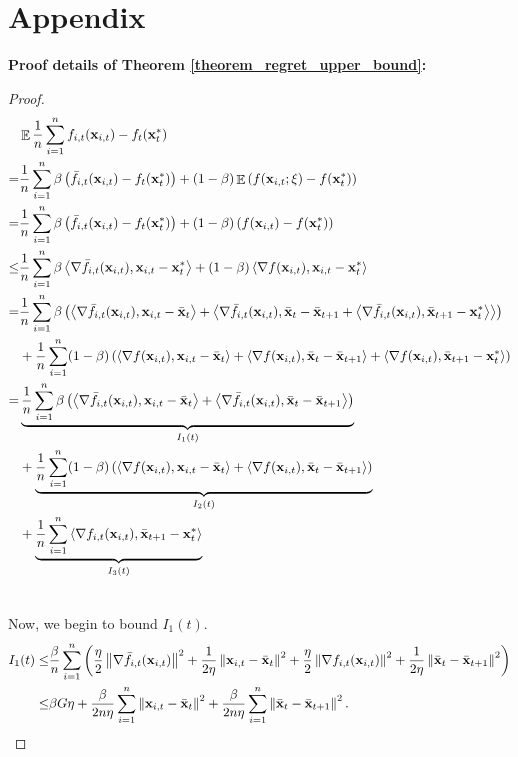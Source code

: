 \documentclass{article}
\begin{document}
\section*{Appendix}

\textbf{Proof details of Theorem \ref{theorem_regret_upper_bound}:}
\begin{proof}
\begin{align}
\nonumber
& \mathop{\mathbb{E}} \frac{1}{n}\sum_{i=1}^n f_{i,t}({\bf x}_{i,t}) - f_t({\bf x}_t^\ast) \\ \nonumber
=& \frac{1}{n}\sum_{i=1}^n \beta \left( \bar{f}_{i,t}({\bf x}_{i,t}) - f_t({\bf x}_t^\ast) \right) + (1-\beta) \mathop{\mathbb{E}} \left( f({\bf x}_{i,t};\xi) - f({\bf x}_t^\ast) \right) \\ \nonumber
=& \frac{1}{n}\sum_{i=1}^n \beta \left( \bar{f}_{i,t}({\bf x}_{i,t}) - f_t({\bf x}_t^\ast) \right) + (1-\beta) \left( f({\bf x}_{i,t}) - f({\bf x}_t^\ast) \right) \\ \nonumber 
\le & \frac{1}{n}\sum_{i=1}^n \beta \left\langle\nabla \bar{f}_{i,t}({\bf x}_{i,t}), {\bf x}_{i,t} - {\bf x}_t^\ast  \right\rangle + (1-\beta) \left\langle\nabla f({\bf x}_{i,t}), {\bf x}_{i,t} - {\bf x}_t^\ast  \right\rangle \\ \nonumber
 = & \frac{1}{n}\sum_{i=1}^n \beta \left( \left\langle\nabla \bar{f}_{i,t}({\bf x}_{i,t}), {\bf x}_{i,t} - \bar{{\bf x}}_t  \right\rangle + \left\langle\nabla \bar{f}_{i,t}({\bf x}_{i,t}), \bar{{\bf x}}_t - \bar{{\bf x}}_{t+1} + \left\langle\nabla \bar{f}_{i,t}({\bf x}_{i,t}), \bar{{\bf x}}_{t+1} - {\bf x}_t^\ast  \right\rangle  \right\rangle  \right) \\ \nonumber 
 & + \frac{1}{n}\sum_{i=1}^n (1-\beta) \left(  \left\langle\nabla f({\bf x}_{i,t}), {\bf x}_{i,t} - \bar{{\bf x}}_t  \right\rangle +  \left\langle\nabla f({\bf x}_{i,t}), \bar{{\bf x}}_t - \bar{{\bf x}}_{t+1}  \right\rangle + \left\langle\nabla f({\bf x}_{i,t}), \bar{{\bf x}}_{t+1} - {\bf x}_t^\ast  \right\rangle  \right)\\ \nonumber
= & \underbrace{ \frac{1}{n}\sum_{i=1}^n \beta \left( \left\langle\nabla \bar{f}_{i,t}({\bf x}_{i,t}), {\bf x}_{i,t} - \bar{{\bf x}}_t  \right\rangle + \left\langle\nabla \bar{f}_{i,t}({\bf x}_{i,t}), \bar{{\bf x}}_t - \bar{{\bf x}}_{t+1}  \right\rangle  \right) }_{I_1(t)} \\ \nonumber 
 & + \underbrace{ \frac{1}{n}\sum_{i=1}^n (1-\beta) \left(  \left\langle\nabla f({\bf x}_{i,t}), {\bf x}_{i,t} - \bar{{\bf x}}_t  \right\rangle +  \left\langle\nabla f({\bf x}_{i,t}), \bar{{\bf x}}_t - \bar{{\bf x}}_{t+1}  \right\rangle \right) }_{I_2(t)}\\ \nonumber 
&+ \underbrace{ \frac{1}{n}\sum_{i=1}^n \left\langle\nabla f_{i,t}({\bf x}_{i,t}), \bar{{\bf x}}_{t+1} - {\bf x}_t^\ast  \right\rangle }_{I_3(t)}\\ \nonumber
\end{align}

Now, we begin to bound $I_1(t)$.
\begin{align}
\nonumber
I_1(t) \le & \frac{\beta}{n}\sum_{i=1}^n \left(  \frac{\eta}{2}\left\lVert\nabla \bar{f}_{i,t}({\bf x}_{i,t})\right\rVert^2 + \frac{1}{2\eta}\left\lVert{\bf x}_{i,t} - \bar{{\bf x}}_t\right\rVert^2  + \frac{\eta}{2}\left\lVert\nabla f_{i,t}({\bf x}_{i,t})\right\rVert^2 + \frac{1}{2\eta}\left\lVert\bar{{\bf x}}_t - \bar{{\bf x}}_{t+1}\right\rVert^2  \right)\\ \nonumber
\le & \beta G \eta + \frac{\beta}{2n\eta }\sum_{i=1}^n \left\lVert{\bf x}_{i,t} - \bar{{\bf x}}_t\right\rVert^2 + \frac{\beta }{2n\eta }\sum_{i=1}^n \left\lVert\bar{{\bf x}}_t - \bar{{\bf x}}_{t+1}\right\rVert^2.
\end{align}


\end{proof}
\end{document}
